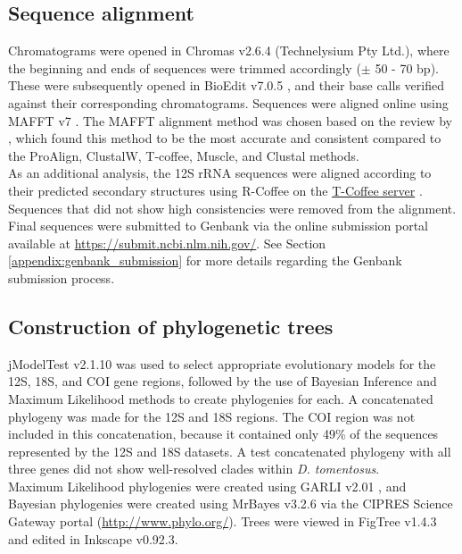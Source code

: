 \subsection{Sequence alignment}
Chromatograms were opened in Chromas v2.6.4 (Technelysium Pty Ltd.), where the beginning and ends of sequences were trimmed accordingly ($\pm$ 50 - 70 bp). These were subsequently opened in BioEdit v7.0.5 \citep{Hall1999BioEdit:95/98/NT}, and their base calls verified against their corresponding chromatograms. Sequences were aligned online using MAFFT v7 \citep{Katoh2017MAFFTVisualization}. The MAFFT alignment method was chosen based on the review by \citet{Morrison2006L.Purposes}, which found this method to be the most accurate and consistent compared to the ProAlign, ClustalW, T-coffee, Muscle, and Clustal methods. \\
As an additional analysis, the 12S rRNA sequences were aligned according to their predicted secondary structures using R-Coffee \citep{moretti2008, wilm2008} on the \href{http://tcoffee.crg.cat/apps/tcoffee/index.html}{T-Coffee server} \citep{notredame2000t, di2011t}. Sequences that did not show high consistencies were removed from the alignment. \\
Final sequences were submitted to Genbank via the online submission portal available at \url{https://submit.ncbi.nlm.nih.gov/}. See Section \ref{appendix:genbank_submission} for more details regarding the Genbank submission process.

\subsection{Construction of phylogenetic trees}
jModelTest v2.1.10 \citep{Guindon2003ALikelihood., Darriba2012JModelTestComputing} was used to select appropriate evolutionary models for the 12S, 18S, and COI gene regions, followed by the use of Bayesian Inference and Maximum Likelihood methods to create phylogenies for each. A concatenated phylogeny was made for the 12S and 18S regions. The COI region was not included in this concatenation, because it contained only 49\% of the sequences represented by the 12S and 18S datasets. A test concatenated phylogeny with all three genes did not show well-resolved clades within \textit{D. tomentosus}. \\
Maximum Likelihood \citep{Felsenstein1981EvolutionaryApproach} phylogenies were created using GARLI v2.01 \citep{zwickl2006genetic}, and Bayesian phylogenies were created using MrBayes v3.2.6 \citep{Huelsenbeck2001MRBAYES:Trees.} via the CIPRES Science Gateway portal \citep{Miller2010CreatingTrees} (\url{http://www.phylo.org/}). Trees were viewed in FigTree v1.4.3 and edited in Inkscape v0.92.3. 

